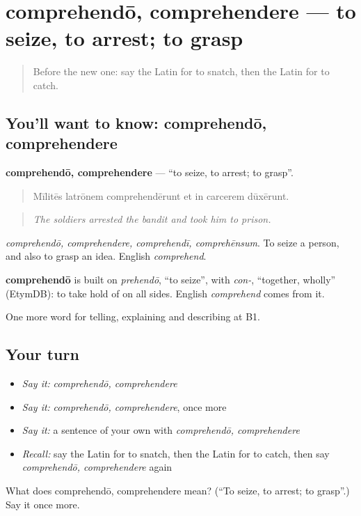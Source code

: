 \section[comprehendō, comprehendere]{comprehendō, comprehendere — to seize, to arrest; to grasp}

\label{lesson:LA-C304-comprehendo}



\begin{quote}
Before the new one: say the Latin for to snatch, then the Latin for to catch.
\end{quote}

\subsection*{You'll want to know: comprehendō, comprehendere}
\textbf{comprehendō, comprehendere} — \textquotedblleft{}to seize, to arrest; to grasp\textquotedblright{}.

\begin{quote}
Mīlitēs latrōnem comprehendērunt et in carcerem dūxērunt.
\end{quote}

\begin{quote}
\emph{The soldiers arrested the bandit and took him to prison.}
\end{quote}

\emph{comprehendō, comprehendere, comprehendī, comprehēnsum}. To seize a person, and also to grasp an idea. English \emph{comprehend}.

\begin{cousinweb}
\textbf{comprehendō} is built on \emph{prehendō}, \textquotedblleft{}to seize\textquotedblright{}, with \emph{con-}, \textquotedblleft{}together, wholly\textquotedblright{} (EtymDB): to take hold of on all sides. English \emph{comprehend} comes from it.
\end{cousinweb}

\begin{grammarlens}[title={What you've built}]
One more word for telling, explaining and describing at B1.
\end{grammarlens}

\subsection*{Your turn}
\begin{itemize}
\raggedright
  \item \emph{Say it:} \emph{comprehendō, comprehendere}
  \item \emph{Say it:} \emph{comprehendō, comprehendere}, once more
  \item \emph{Say it:} a sentence of your own with \emph{comprehendō, comprehendere}
  \item \emph{Recall:} say the Latin for to snatch, then the Latin for to catch, then say \emph{comprehendō, comprehendere} again
\end{itemize}

\begin{tcolorbox}[breakable,colback=teal!4,colframe=teal!35!black,title={Before you move on}]
What does comprehendō, comprehendere mean? (\textquotedblleft{}To seize, to arrest; to grasp\textquotedblright{}.) Say it once more.
\end{tcolorbox}
